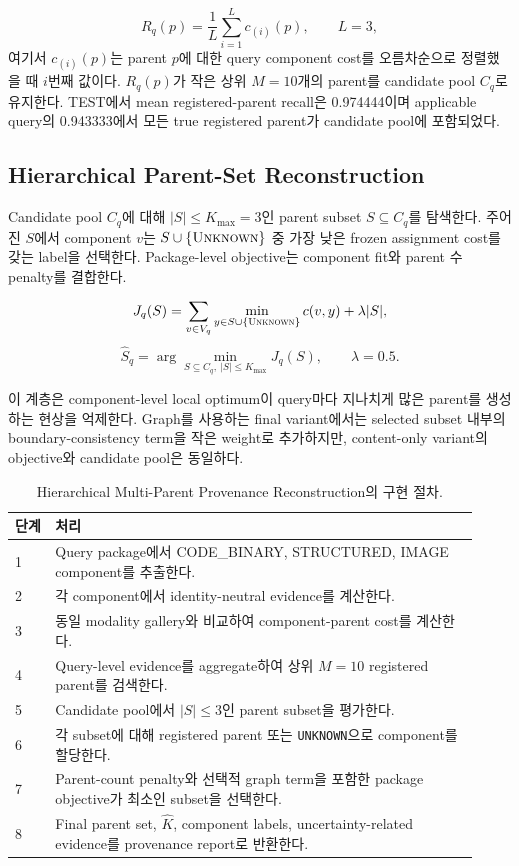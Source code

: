 \documentclass[runningheads]{llncs}
\begin{document}
\[
R_q(p)=\frac{1}{L}\sum_{i=1}^{L} c_{(i)}(p),\qquad L=3,
\]
여기서 $c_{(i)}(p)$는 parent $p$에 대한 query component cost를 오름차순으로 정렬했을 때 $i$번째 값이다. $R_q(p)$가 작은 상위 $M=10$개의 parent를 candidate pool $C_q$로 유지한다. TEST에서 mean registered-parent recall은 0.974444이며 applicable query의 0.943333에서 모든 true registered parent가 candidate pool에 포함되었다.

\subsection{Hierarchical Parent-Set Reconstruction}

Candidate pool $C_q$에 대해 $|S|\le K_{\max}=3$인 parent subset $S\subseteq C_q$를 탐색한다. 주어진 $S$에서 component $v$는 $S\cup\{\textsc{Unknown}\}$ 중 가장 낮은 frozen assignment cost를 갖는 label을 선택한다. Package-level objective는 component fit와 parent 수 penalty를 결합한다.

\[
J_q(S)=\sum_{v\in V_q}\min_{y\in S\cup\{\textsc{Unknown}\}} c(v,y)+\lambda |S|,
\]
\[
\hat S_q=\arg\min_{S\subseteq C_q,\ |S|\le K_{\max}} J_q(S),\qquad \lambda=0.5.
\]

이 계층은 component-level local optimum이 query마다 지나치게 많은 parent를 생성하는 현상을 억제한다. Graph를 사용하는 final variant에서는 selected subset 내부의 boundary-consistency term을 작은 weight로 추가하지만, content-only variant의 objective와 candidate pool은 동일하다.

\begin{table}[!htbp]
\centering
\caption{Hierarchical Multi-Parent Provenance Reconstruction의 구현 절차.}
\label{tab:algorithm}
\scriptsize
\begin{tabular}{p{0.08\linewidth}p{0.84\linewidth}}
\toprule
단계 & 처리\\
\midrule
1 & Query package에서 CODE\_BINARY, STRUCTURED, IMAGE component를 추출한다.\\
2 & 각 component에서 identity-neutral evidence를 계산한다.\\
3 & 동일 modality gallery와 비교하여 component-parent cost를 계산한다.\\
4 & Query-level evidence를 aggregate하여 상위 \(M=10\) registered parent를 검색한다.\\
5 & Candidate pool에서 \(|S|\le3\)인 parent subset을 평가한다.\\
6 & 각 subset에 대해 registered parent 또는 \texttt{UNKNOWN}으로 component를 할당한다.\\
7 & Parent-count penalty와 선택적 graph term을 포함한 package objective가 최소인 subset을 선택한다.\\
8 & Final parent set, \(\hat K\), component labels, uncertainty-related evidence를 provenance report로 반환한다.\\
\bottomrule
\end{tabular}
\end{table}
\end{document}
